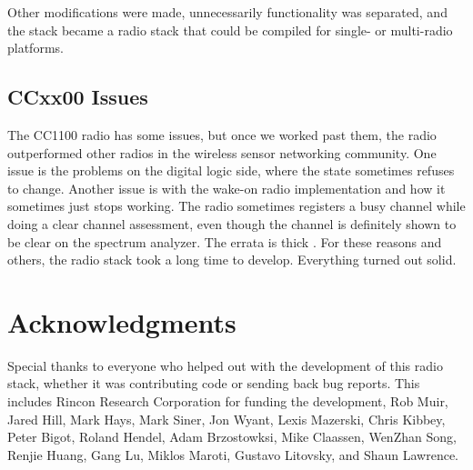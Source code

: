 \documentclass{article}
\begin{document}
Other modifications were made, unnecessarily functionality was separated, and the stack became a radio
stack that could be compiled for single- or multi-radio platforms.

\subsection{CCxx00 Issues}
The CC1100 radio has some issues, but once we worked past them, the radio outperformed other radios 
in the wireless sensor networking community.  One issue is the problems on the digital logic side, where
the state sometimes refuses to change. Another issue is with the wake-on radio implementation and how
it sometimes just stops working.  The radio sometimes registers a busy channel while doing a clear
channel assessment, even though the channel is definitely shown to be clear on the spectrum analyzer.
The errata is thick \cite{cc1101errata}.  For these reasons and others, the radio stack took a long time to develop.  
Everything turned out solid.

\section{Acknowledgments}
Special thanks to everyone who helped out with the development of this radio stack, whether it was 
contributing code or sending back bug reports. This includes Rincon Research Corporation for funding 
the development, Rob Muir, Jared Hill, Mark Hays, Mark Siner, Jon Wyant, Lexis Mazerski, Chris Kibbey, 
Peter Bigot, Roland Hendel, Adam Brzostowksi, Mike Claassen, WenZhan Song, Renjie Huang, Gang Lu, Miklos Maroti, 
Gustavo Litovsky, and Shaun Lawrence.



		
\end{document}

